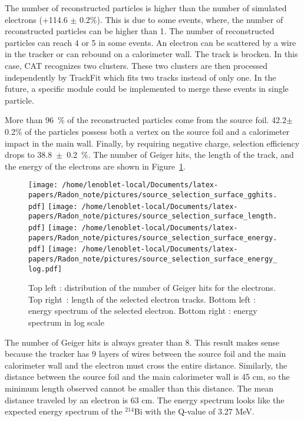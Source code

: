\documentclass[main.tex]{subfiles}
\begin{document}
\noindent The number of reconstructed particles is higher than the number of simulated electrons (+114.6 $\pm$ 0.2\%). This is due to some events, where, the number of reconstructed particles can be higher than 1. The number of reconstructed particles can reach 4 or 5 in some events. An electron can be scattered by a wire in the tracker or can rebound on a calorimeter wall. The track is brocken. In this case, CAT recognizes two clusters. These two clusters are then processed independently by TrackFit which fits two tracks instead of only one. In the future, a specific module could be implemented to merge these events in single particle. 


\bigskip


\noindent More than 96~\% of the reconstructed particles come from the source foil. 42.2$\pm$0.2\% of the particles possess both a vertex on the source foil and a calorimeter impact in the main wall. Finally, by requiring negative charge, selection efficiency drops to 38.8~$\pm$~0.2~$\%$.  The number of Geiger hits, the length of the track, and the energy of the electrons are shown in Figure~\ref{electron_gghit_length_time_energy_sss}.


\begin{figure}[h!]
\begin{center}
\texttt{[image: /home/lenoblet-local/Documents/latex-papers/Radon\_note/pictures/source\_selection\_surface\_gghits.pdf]}
\texttt{[image: /home/lenoblet-local/Documents/latex-papers/Radon\_note/pictures/source\_selection\_surface\_length.pdf]}
\texttt{[image: /home/lenoblet-local/Documents/latex-papers/Radon\_note/pictures/source\_selection\_surface\_energy.pdf]}
\texttt{[image: /home/lenoblet-local/Documents/latex-papers/Radon\_note/pictures/source\_selection\_surface\_energy\_log.pdf]}
\caption{Top left : distribution of the number of Geiger hits for the electrons. Top right~: length of the selected electron tracks. Bottom left : energy spectrum of the selected electron. Bottom right : energy spectrum in log scale}
\label{electron_gghit_length_time_energy_sss}
\end{center}
\end{figure}


\bigskip


\noindent The number of Geiger hits is always greater than 8. This result makes sense because the tracker has 9 layers of wires between the source foil and the main calorimeter wall and the electron must cross the entire distance. Similarly, the distance between the source foil and the main calorimeter wall is 45 cm, so the minimum length observed cannot be smaller than this distance. The mean distance traveled by an electron is 63 cm. The energy spectrum looks like the expected energy spectrum of the  $^{\text{214}}$Bi with the Q-value of 3.27 MeV.
\end{document}

